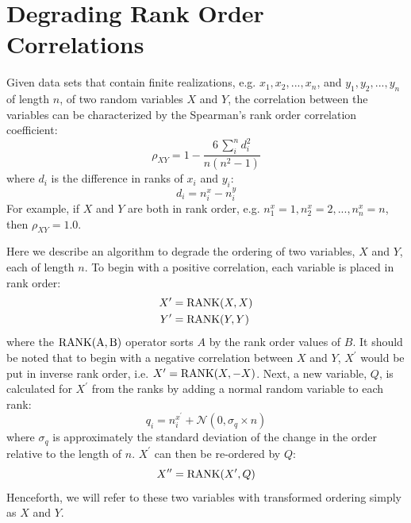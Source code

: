 \documentclass[useAMS,fleqn,usenatbib]{mnras}
\begin{document}
\section{Degrading Rank Order Correlations}
\label{appendix:ranks}

Given data sets that contain finite realizations, e.g. $x_1, x_2, ..., x_n$, and $y_1, y_2, ..., y_n$ of length $n$, of two random variables $X$ and $Y$, the correlation between the variables can be characterized by the Spearman's rank order correlation coefficient:
%
\begin{equation}
\rho_{XY} =1-\frac{6\, \sum_i^{n} d_i^2}{n(n^2-1)}
\end{equation}
%
where $d_i$ is the difference in ranks of $x_i$ and $y_i$:
%
\begin{equation}
d_i = n_i^x- n_i^y
\end{equation}
%
For example, if $X$ and $Y$ are both in rank order, e.g. $n_1^x = 1, n_2^x=2, ..., n_n^x = n$, then $\rho_{XY}=1.0$.

Here we describe an algorithm to degrade the ordering of two variables, $X$ and $Y$, each of length $n$.  To begin with a positive correlation, each variable is placed in rank order:  
%
\begin{align}
X^{\prime} &= {\rm RANK}(X,X) \nonumber \\
Y^{\prime} &= {\rm RANK}(Y,Y) 
\end{align}
%
where the ${\rm RANK(A,B)}$ operator sorts $A$ by the rank order values of $B$.  It should be noted that to begin with a negative correlation between $X$ and $Y$, $X^{\prime}$ would be put in inverse rank order, i.e. $X^{\prime} = {\rm RANK}(X,-X)$.  Next, a new variable, $Q$, is calculated for $X^{\prime}$ from the ranks by adding a normal random variable to each rank:   
%
\begin{equation}
q_i = n^{x^{\prime}}_i + \mathcal{N}(0, \sigma_q \times n)
\end{equation}
%
where $\sigma_q$ is approximately the standard deviation of the change in the order relative to the length of $n$.  $X^{\prime}$ can then be re-ordered by $Q$:
%
\begin{equation}
X^{\prime\prime}  = {\rm RANK}(X^{\prime}, Q)
\end{equation}
%
Henceforth, we will refer to these two variables with transformed ordering simply as $X$ and $Y$.
\end{document}
